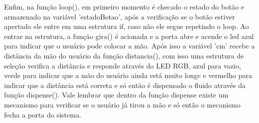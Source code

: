 \documentclass[conference]{IEEEtran}
\begin{document}
        Enfim, na função loop(), em primeiro momento é checado
        o estado do botão e armazenado na variável ’estadoBotao’,
        após a verificação se o botão estiver apertado ele entre em
        uma estrutura if, caso não ele segue repetindo o loop. Ao
        entrar na estrutura, a função gira() é acionada e a porta abre
        e acende o led azul para indicar que o usuário pode colocar
        a mão. Após isso a variável ’cm’ recebe a distância da mão
        do usuário da função distancia(), com isso uma estrutura de
        seleção verifica a distância e responde através do LED RGB,
        azul para vazio, verde para indicar que a mão do usuário ainda
        está muito longe e vermelho para indicar que a distância está
        correta e só então é dispensado o fluido através da função
        dispense(). Vale lembrar que dentro da função dispense existe
        um mecanismo para verificar se o usuário já tirou a mão e só
        então o mecanismo fecha a porta do sistema.
\end{document}
